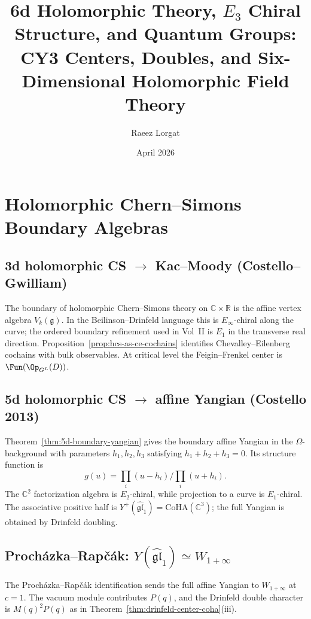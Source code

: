 \documentclass[11pt]{article}
\title{6d Holomorphic Theory, $E_3$ Chiral Structure, and Quantum Groups:\\
\large CY3 Centers, Doubles, and Six-Dimensional Holomorphic Field Theory}
\author{Raeez Lorgat}
\date{April 2026}
\newcommand{\fgl}{\mathfrak{gl}}
\newcommand{\frakg}{\mathfrak{g}}
\newcommand{\CoHA}{\mathrm{CoHA}}
\newcommand{\C}{\mathbb{C}}
\newcommand{\R}{\mathbb{R}}
\theoremstyle{plain}
\theoremstyle{definition}
\theoremstyle{remark}
\begin{document}
\maketitle

\tableofcontents

\section{Holomorphic Chern--Simons Boundary Algebras}

\subsection{3d holomorphic CS $\to$ Kac--Moody (Costello--Gwilliam)}

The boundary of holomorphic Chern--Simons theory on $\C \times \R$
is the affine vertex algebra $V_k(\frakg)$. In the Beilinson--Drinfeld
language this is $E_\infty$-chiral along the curve; the ordered
boundary refinement used in Vol~II is $E_1$ in the transverse real
direction. Proposition~\ref{prop:hcs-as-ce-cochains} identifies
Chevalley--Eilenberg cochains with bulk observables. At critical level
the Feigin--Frenkel center is $\Fun(\Op_{G^L}(D))$.

\subsection{5d holomorphic CS $\to$ affine Yangian (Costello 2013)}

Theorem~\ref{thm:5d-boundary-yangian} gives the boundary affine Yangian
in the $\Omega$-background with parameters
$h_1,h_2,h_3$ satisfying $h_1+h_2+h_3=0$. Its structure function is
\[
 g(u)=\prod_i(u-h_i)\big/\prod_i(u+h_i).
\]
The $\C^2$ factorization algebra is $E_2$-chiral, while projection to a
curve is $E_1$-chiral. The associative positive half is
$Y^+(\widehat{\fgl}_1)=\CoHA(\C^3)$; the full Yangian is obtained by
Drinfeld doubling.

\subsection{Proch\'azka--Rap\v{c}\'ak: $Y(\widehat{\fgl}_1) \simeq W_{1+\infty}$}

The Proch\'azka--Rap\v{c}\'ak identification sends the full affine
Yangian to $W_{1+\infty}$ at $c=1$. The vacuum module contributes
$P(q)$, and the Drinfeld double character is
$M(q)^2P(q)$ as in Theorem~\ref{thm:drinfeld-center-coha}(iii).
\end{document}
